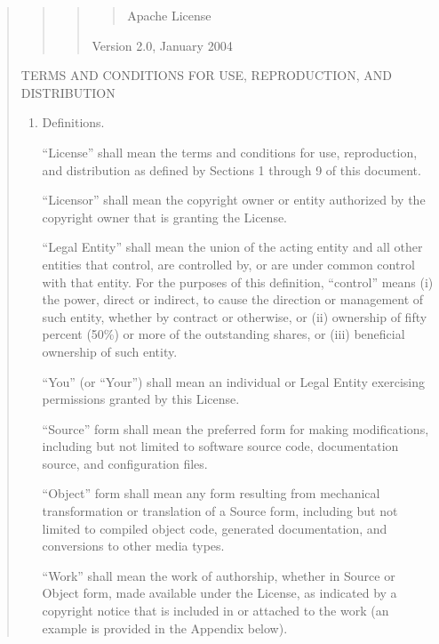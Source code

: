 \documentclass[letterpaper,10pt,english,openany,oneside]{sphinxmanual}
\begin{document}
\begin{quote}
\begin{quote}
\begin{quote}
\begin{quote}

\sphinxAtStartPar
Apache License
\end{quote}

\sphinxAtStartPar
Version 2.0, January 2004
\end{quote}

\sphinxAtStartPar
{}
\end{quote}

\sphinxAtStartPar
TERMS AND CONDITIONS FOR USE, REPRODUCTION, AND DISTRIBUTION
\begin{enumerate}
%
\item {} 
\sphinxAtStartPar
Definitions.

\sphinxAtStartPar
“License” shall mean the terms and conditions for use, reproduction,
and distribution as defined by Sections 1 through 9 of this document.

\sphinxAtStartPar
“Licensor” shall mean the copyright owner or entity authorized by
the copyright owner that is granting the License.

\sphinxAtStartPar
“Legal Entity” shall mean the union of the acting entity and all
other entities that control, are controlled by, or are under common
control with that entity. For the purposes of this definition,
“control” means (i) the power, direct or indirect, to cause the
direction or management of such entity, whether by contract or
otherwise, or (ii) ownership of fifty percent (50\%) or more of the
outstanding shares, or (iii) beneficial ownership of such entity.

\sphinxAtStartPar
“You” (or “Your”) shall mean an individual or Legal Entity
exercising permissions granted by this License.

\sphinxAtStartPar
“Source” form shall mean the preferred form for making modifications,
including but not limited to software source code, documentation
source, and configuration files.

\sphinxAtStartPar
“Object” form shall mean any form resulting from mechanical
transformation or translation of a Source form, including but
not limited to compiled object code, generated documentation,
and conversions to other media types.

\sphinxAtStartPar
“Work” shall mean the work of authorship, whether in Source or
Object form, made available under the License, as indicated by a
copyright notice that is included in or attached to the work
(an example is provided in the Appendix below).


\end{enumerate}
\end{quote}
\end{document}
